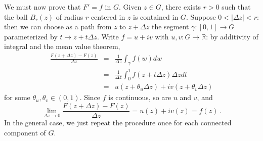 \documentclass[12pt]{article}
\begin{document}
We must now prove that $F'=f$ in $G$.
Given $z\in G$, there exists $r>0$
such that the ball $B_r(z)$ of radius $r$ centered in $z$
is contained in $G$.
Suppose $0<|\Delta{z}|<r$:
then we can choose as a path from $z$ to $z+\Delta{z}$
the segment $\gamma:[0,1]\to G$ parameterized by $t\mapsto z+t\Delta{z}$.
Write $f=u+iv$ with $u,v:G\to\mathbb{R}$:
by additivity of integral and the mean value theorem,
\begin{eqnarray*}
\frac{F(z+\Delta{z})-F(z)}{\Delta{z}}
& = & \frac{1}{\Delta{z}}\int_{\gamma}f(w)dw \\
& = & \frac{1}{\Delta{z}}\int_0^1f(z+t\Delta{z})\Delta{z}dt \\
& = & u(z+\theta_u\Delta{z})+iv(z+\theta_v\Delta{z})
\end{eqnarray*}
for some $\theta_u,\theta_v\in(0,1)$.
Since $f$ is continuous, so are $u$ and $v$, and
\begin{displaymath}
\lim_{\Delta{z}\to 0} \frac{F(z+\Delta{z})-F(z)}{\Delta{z}}
= u(z) + iv(z) = f(z) \,.
\end{displaymath}
In the general case, we just repeat the procedure
once for each connected component of $G$.

\end{document}
